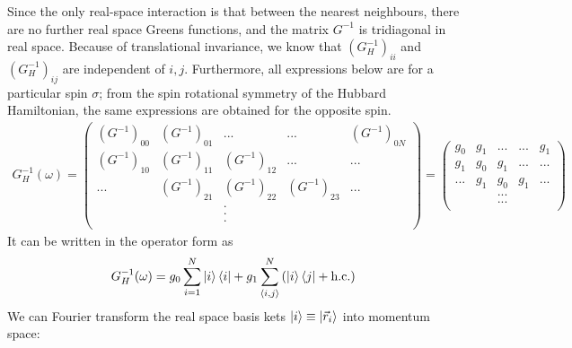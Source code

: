 \documentclass[12pt]{article}
\numberwithin{equation}{section}
\begin{document}
Since the only real-space interaction is that between the nearest neighbours, there are no further real space Greens functions, and the matrix $G^{-1}$ is tridiagonal in real space. Because of translational invariance, we know that $\left(G_H^{-1}\right)_{ii}$ and $\left(G_H^{-1}\right)_{ij}$ are independent of $i,j$. Furthermore, all expressions below are for a particular spin $\sigma$; from the spin rotational symmetry of the Hubbard Hamiltonian, the same expressions are obtained for the opposite spin.
\begin{equation}\begin{aligned}
	G^{-1}_H(\omega) = \begin{pmatrix} \left(G^{-1}\right)_{00} & \left(G^{-1}\right)_{01} & ... & ... & \left(G^{-1}\right)_{0N}\\
		\left(G^{-1}\right)_{10} & \left(G^{-1}\right)_{11} & \left(G^{-1}\right)_{12} & ... & ...\\
		... & \left(G^{-1}\right)_{21} & \left(G^{-1}\right)_{22} & \left(G^{-1}\right)_{23} & ... \\
		    &&.&&\\
		    &&.&&\\
		    &&.&&\\
\end{pmatrix} = \begin{pmatrix} g_0 & g_1 & ... & ... & g_1\\
		g_1 & g_0 & g_1 & ... & ...\\
		... & g_1 & g_0 & g_1 & ... \\
		    &&...&&\\
		    &&...&&\\
\end{pmatrix} 
\end{aligned}\end{equation}
It can be written in the operator form as
\begin{equation}\begin{aligned}
	G_H^{-1}(\omega) = g_0\sum_{i=1}^N\ket{i}\bra{i} + g_1\sum_{\left<i,j \right>}^N\left( \ket{i}\bra{j} + \text{h.c.}\right)
\end{aligned}\end{equation}
We can Fourier transform the real space basis kets $\ket{i} \equiv \ket{\vec r_i}$ into momentum space:
\end{document}

